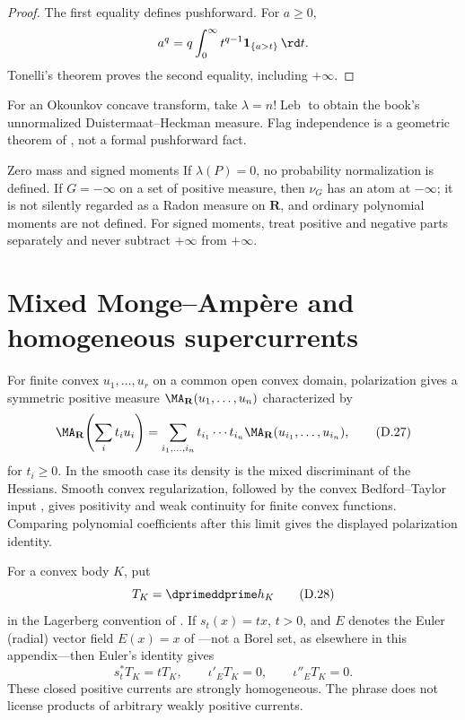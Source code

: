 \begin{proof}
The first equality defines pushforward.
For \(a\geq0\),
\[
 a^q=q\int_0^\infty t^{q-1}\mathbf 1_{\{a>t\}}\,\rd t.
\]
Tonelli's theorem proves the second equality, including \(+\infty\).
\end{proof}

For an Okounkov concave transform, take
\(\lambda=n!\operatorname{Leb}\) to obtain the book's unnormalized
Duistermaat--Heckman measure.
Flag independence is a geometric theorem of
, not a formal pushforward fact.

\begin{warning}{Zero mass and signed moments}
\label{warn:appD-zero-and-signed-moments}
If \(\lambda(P)=0\), no probability normalization is defined.
If \(G=-\infty\) on a set of positive measure, then \(\nu_G\) has an atom at
\(-\infty\); it is not silently regarded as a Radon measure on
\(\mathbf R\), and ordinary polynomial moments are not defined.
For signed moments, treat positive and negative parts separately and never
subtract \(+\infty\) from \(+\infty\).
\end{warning}

\section{Mixed Monge--Amp\`ere and homogeneous supercurrents}
\label{sec:appD-supercurrents}

For finite convex \(u_1,\ldots,u_r\) on a common open convex domain,
polarization gives a symmetric positive measure
\(\MA_{\mathbf R}(u_1,\ldots,u_n)\) characterized by
\[
 \MA_{\mathbf R}\!\left(\sum_i t_i u_i\right)
 =
 \sum_{i_1,\ldots,i_n}
 t_{i_1}\cdots t_{i_n}
 \MA_{\mathbf R}(u_{i_1},\ldots,u_{i_n}),
\tag{D.27}\label{eq:appD-mixed-ma-polarization}
\]
for \(t_i\geq0\).
In the smooth case its density is the mixed discriminant of the Hessians.
Smooth convex regularization, followed by the convex Bedford--Taylor
input , gives positivity and weak
continuity for finite convex functions.  Comparing polynomial
coefficients after this limit gives the displayed polarization identity.

For a convex body \(K\), put
\[
                             T_K=\dprimeddprime h_K
\tag{D.28}\label{eq:appD-support-current}
\]
in the Lagerberg convention of .
If \(s_t(x)=tx\), \(t>0\), and \(E\) denotes the Euler (radial) vector field
\(E(x)=x\) of ---not a Borel set, as
elsewhere in this appendix---then Euler's identity gives
\[
 s_t^*T_K=tT_K,\qquad
 \iota'_ET_K=0,\qquad
 \iota''_ET_K=0.
\tag{D.29}\label{eq:appD-strong-homogeneity}
\]
These closed positive currents are strongly homogeneous.
The phrase does not license products of arbitrary weakly positive currents.

